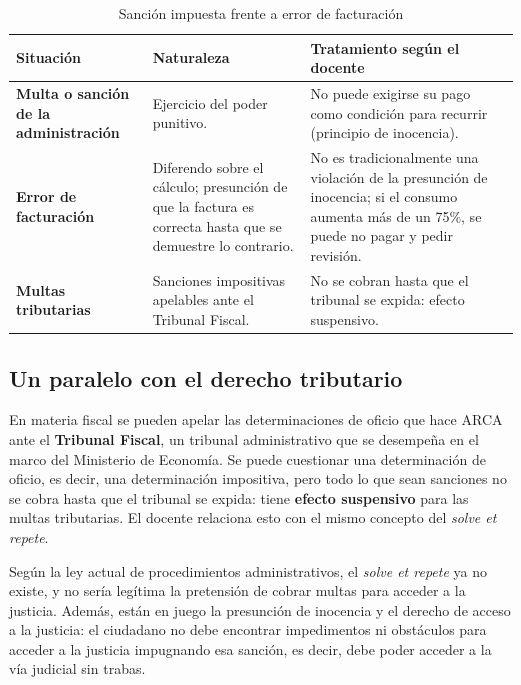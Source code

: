 \documentclass[12pt,oneside]{book}
\begin{document}
\begin{table}[H]
\centering
\caption{Sanción impuesta frente a error de facturación}
\small
\begin{tabularx}{\textwidth}{
    >{\raggedright\arraybackslash}p{}
    >{\raggedright\arraybackslash}X
    >{\raggedright\arraybackslash}X
}
\toprule
\textbf{Situación} & \textbf{Naturaleza} & \textbf{Tratamiento según el docente} \\
\midrule
\textbf{Multa o sanción de la administración} & Ejercicio del poder punitivo. & No puede exigirse su pago como condición para recurrir (principio de inocencia). \\
\textbf{Error de facturación} & Diferendo sobre el cálculo; presunción de que la factura es correcta hasta que se demuestre lo contrario. & No es tradicionalmente una violación de la presunción de inocencia; si el consumo aumenta más de un 75\%, se puede no pagar y pedir revisión. \\
\textbf{Multas tributarias} & Sanciones impositivas apelables ante el Tribunal Fiscal. & No se cobran hasta que el tribunal se expida: efecto suspensivo. \\
\bottomrule
\end{tabularx}
\end{table}

\subsection{Un paralelo con el derecho tributario}

En materia fiscal se pueden apelar las determinaciones de oficio que hace ARCA ante el \textbf{Tribunal Fiscal}, un tribunal administrativo que se desempeña en el marco del Ministerio de Economía. Se puede cuestionar una determinación de oficio, es decir, una determinación impositiva, pero todo lo que sean sanciones no se cobra hasta que el tribunal se expida: tiene \textbf{efecto suspensivo} para las multas tributarias. El docente relaciona esto con el mismo concepto del \textit{solve et repete}.

Según la ley actual de procedimientos administrativos, el \textit{solve et repete} ya no existe, y no sería legítima la pretensión de cobrar multas para acceder a la justicia. Además, están en juego la presunción de inocencia y el derecho de acceso a la justicia: el ciudadano no debe encontrar impedimentos ni obstáculos para acceder a la justicia impugnando esa sanción, es decir, debe poder acceder a la vía judicial sin trabas.
\end{document}
